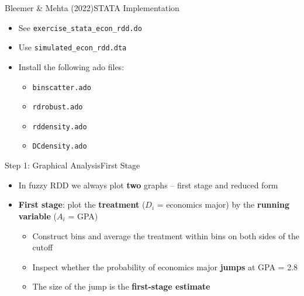 \documentclass[hyperref={pdfpagelabels=false}]{beamer}
\begin{document}
\begin{frame}{Bleemer \& Mehta (2022)}{STATA Implementation}
	\begin{itemize}
		\item See \texttt{exercise\_stata\_econ\_rdd.do}
		\vspace{0.2cm}
		\item Use \texttt{simulated\_econ\_rdd.dta}
		\vspace{0.2cm}
		\item Install the following ado files:
		\begin{itemize}
			\vspace{0.2cm}
			\item \texttt{binscatter.ado}
			\item \texttt{rdrobust.ado}
			\item \texttt{rddensity.ado}
			\item \texttt{DCdensity.ado}
		\end{itemize}
	\end{itemize}
\end{frame}



\begin{frame}{Step 1: Graphical Analysis}{First Stage}
	\begin{itemize}
		\item In fuzzy RDD we always plot \textbf{two} graphs -- first stage and reduced form
		\vspace{0.2cm}
		\item \textbf{First stage}: plot the \textbf{treatment} ($D_i$ = economics major)
		by the \textbf{running variable} ($A_i$ = GPA)
		\vspace{0.2cm}
		\begin{itemize}
			\item Construct bins and average the treatment within bins on both sides of the cutoff
			\vspace{0.2cm}
			\item Inspect whether the probability of economics major \textbf{jumps} at GPA = 2.8
			\vspace{0.2cm}
			\item The size of the jump is the \textbf{first-stage estimate}
		\end{itemize}
	\end{itemize}
\end{frame}
\end{document}
